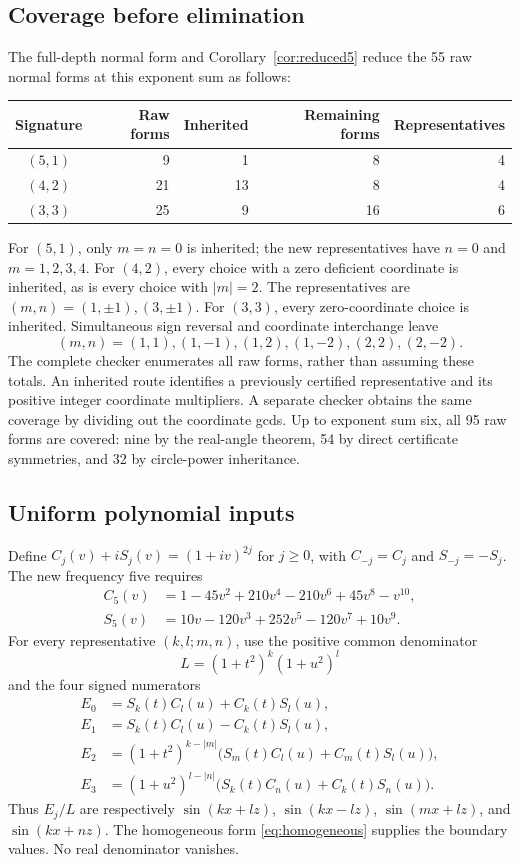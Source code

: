 \documentclass[11pt]{article}
\theoremstyle{definition}\newtheorem{definition}[theorem]{Definition}
\theoremstyle{remark}\newtheorem{remark}[theorem]{Remark}
\begin{document}
\subsection{Coverage before elimination}
The full-depth normal form and Corollary~\ref{cor:reduced5} reduce the 55 raw normal forms at this exponent sum as follows:
\begin{center}
\begin{tabular}{crrrr}
\toprule
Signature & Raw forms & Inherited & Remaining forms & Representatives\\
\midrule
$(5,1)$ & 9 & 1 & 8 & 4\\
$(4,2)$ & 21 & 13 & 8 & 4\\
$(3,3)$ & 25 & 9 & 16 & 6\\
\bottomrule
\end{tabular}
\end{center}
For $(5,1)$, only $m=n=0$ is inherited; the new representatives have $n=0$ and $m=1,2,3,4$. For $(4,2)$, every choice with a zero deficient coordinate is inherited, as is every choice with $|m|=2$. The representatives are $(m,n)=(1,\pm1),(3,\pm1)$. For $(3,3)$, every zero-coordinate choice is inherited. Simultaneous sign reversal and coordinate interchange leave
\[
(m,n)=(1,1),(1,-1),(1,2),(1,-2),(2,2),(2,-2).
\]
The complete checker enumerates all raw forms, rather than assuming these totals. An inherited route identifies a previously certified representative and its positive integer coordinate multipliers. A separate checker obtains the same coverage by dividing out the coordinate gcds. Up to exponent sum six, all 95 raw forms are covered: nine by the real-angle theorem, 54 by direct certificate symmetries, and 32 by circle-power inheritance.

\subsection{Uniform polynomial inputs}
Define $C_j(v)+iS_j(v)=(1+iv)^{2j}$ for $j\ge0$, with $C_{-j}=C_j$ and $S_{-j}=-S_j$. The new frequency five requires
\begin{align*}
C_5(v)&=1-45v^2+210v^4-210v^6+45v^8-v^{10},\\
S_5(v)&=10v-120v^3+252v^5-120v^7+10v^9.
\end{align*}
For every representative $(k,l;m,n)$, use the positive common denominator
\[
L=(1+t^2)^k(1+u^2)^l
\]
and the four signed numerators
\begin{align*}
E_0&=S_k(t)C_l(u)+C_k(t)S_l(u),\\
E_1&=S_k(t)C_l(u)-C_k(t)S_l(u),\\
E_2&=(1+t^2)^{k-|m|}\bigl(S_m(t)C_l(u)+C_m(t)S_l(u)\bigr),\\
E_3&=(1+u^2)^{l-|n|}\bigl(S_k(t)C_n(u)+C_k(t)S_n(u)\bigr).
\end{align*}
Thus $E_j/L$ are respectively $\sin(kx+lz)$, $\sin(kx-lz)$, $\sin(mx+lz)$, and $\sin(kx+nz)$. The homogeneous form \eqref{eq:homogeneous} supplies the boundary values. No real denominator vanishes.
\end{document}
